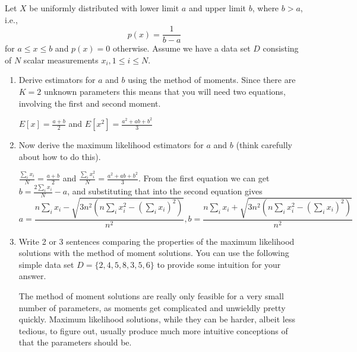 \documentclass[11pt]{article}
\begin{document}
Let $X$ be uniformly distributed with lower limit $a$ and upper
limit $b$, where $b>a$, i.e.,
\[ p(x) = \frac{1}{b-a} \]
for $a \le x \le b$ and $p(x) = 0$ otherwise. Assume we have a data set $D$ consisting of $N$ scalar measurements $x_i, 1 \le i \le N$.
\begin{enumerate}
\item Derive estimators for $a$ and $b$ using the method of moments. Since there are $K=2$ unknown parameters this means that you will need two equations, involving the first and second moment. 

$E[x] = \frac{a+b}{2}$ and $E[x^2] = \frac{a^2 + ab + b^2}{3}$

\item Now derive the maximum likelihood estimators for $a$ and $b$ (think
carefully about how to do this).

$\frac{\sum_i x_i}{N} = \frac{a+b}{2}$ and $\frac{\sum_i x_i^2}{N} = \frac{a^2 + ab + b^2}{3}$. 
From the first equation we can get $b = \frac{2\sum_i x_i}{N} - a$, and substituting that into 
the second equation gives 
\begin{equation}
a=\frac{n\sum_i x_i - \sqrt{3n^2 (n\sum_i x_i^2 - (\sum_i x_i)^2)}}{n^2}, b=\frac{n\sum_i x_i + \sqrt{3n^2 (n\sum_i x_i^2 - (\sum_i x_i)^2)}}{n^2}
\end{equation}

 \item Write 2 or 3 sentences comparing the properties of the maximum likelihood solutions with the method of moment solutions. You can use the following simple data set  $D=\{ 2, 4, 5, 8, 3, 5, 6\}$ to provide some intuition for your answer.

 The method of moment solutions are really only feasible for a very small number of parameters, as moments get complicated and unwieldly pretty quickly. Maximum likelihood solutions, while they can be harder, albeit less tedious, to figure out, usually produce much more intuitive conceptions of that the parameters should be.
\end{enumerate}
\end{document}
